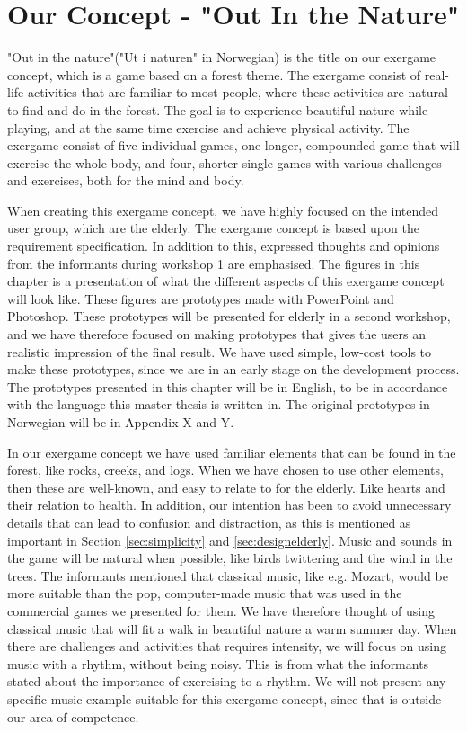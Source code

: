 \section{Our Concept - "Out In the Nature"}
\label{sec:outinthenature}

"Out in the nature"("Ut i naturen" in Norwegian) is the title on our exergame concept, which is a game based on a forest theme. The exergame consist of real-life activities that are familiar to most people, where these activities are natural to find and do in the forest. The goal is to experience beautiful nature while playing, and at the same time exercise and achieve physical activity. The exergame consist of five individual games, one longer, compounded game that will exercise the whole body, and four, shorter single games with various challenges and exercises, both for the mind and body.    

When creating this exergame concept, we have highly focused on the intended user group, which are the elderly. The exergame concept is based upon the requirement specification. In addition to this, expressed thoughts and opinions from the informants during workshop 1 are emphasised. The figures in this chapter is a presentation of what the different aspects of this exergame concept will look like. These figures are prototypes made with PowerPoint and Photoshop. These prototypes will be presented for elderly in a second workshop, and we have therefore focused on making prototypes that gives the users an realistic impression of the final result. We have used simple, low-cost tools to make these prototypes, since we are in an early stage on the development process. The prototypes presented in this chapter will be in English, to be in accordance with the language this master thesis is written in. The original prototypes in Norwegian will be in Appendix X and Y.     

In our exergame concept we have used familiar elements that can be found in the forest, like rocks, creeks, and logs. When we have chosen to use other elements, then these are well-known, and easy to relate to for the elderly. Like hearts and their relation to health. In addition, our intention has been to avoid unnecessary details that can lead to confusion and distraction, as this is mentioned as important in Section \ref{sec:simplicity} and \ref{sec:designelderly}. Music and sounds in the game will be natural when possible, like birds twittering and the wind in the trees. The informants mentioned that classical music, like e.g. Mozart, would be more suitable than the pop, computer-made music that was used in the commercial games we presented for them. We have therefore thought of using classical music that will fit a walk in beautiful nature a warm summer day. When there are challenges and activities that requires intensity, we will focus on using music with a rhythm, without being noisy. This is from what the informants stated about the importance of exercising to a rhythm. We will not present any specific music example suitable for this exergame concept, since that is outside our area of competence. 

